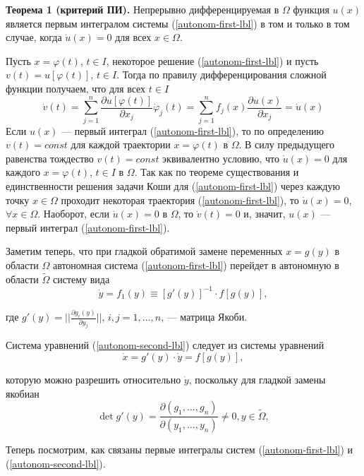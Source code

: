\par \textbf{Теорема 1 (критерий ПИ).} Непрерывно дифференцируемая в $\Omega$ функция $u(x)$ является
первым интегралом системы (\ref{autonom-first-lbl}) в том и только в том случае, когда
$\dot{u}(x) = 0$ для всех $x \in \Omega$.
\par \Proof Пусть $x=\varphi(t)$, $t \in I$, некоторое решение (\ref{autonom-first-lbl}) и пусть $v(t) = u[\varphi(t)]$,
$t \in I$. Тогда по правилу дифференцирования сложной функции получаем, что для всех $t \in I$
$$\dot{v}(t)=\sum_{j=1}^n \frac{\partial u[\varphi(t)]}{\partial x_j}\dot{\varphi}_j(t)=\sum_{j=1}^n f_j(x) \frac{\partial u(x)}{\partial x_j}=\dot{u}(x)$$
Если $u(x)$ — первый интеграл (\ref{autonom-first-lbl}), то по определению $v(t) = const$ для каждой траектории $x= \varphi(t)$ в $\Omega$. В силу предыдущего равенства тождество
$v(t) = const$ эквивалентно условию, что $\dot{u}(x) = 0$ для каждого $x = \varphi(t)$,
$t \in I$ в $\Omega$. Так как по теореме существования и единственности решения
задачи Коши для (\ref{autonom-first-lbl}) через каждую точку $x \in \Omega$ проходит некоторая
траектория (\ref{autonom-first-lbl}), то $\dot{u}(x)=0$, $\forall x \in \Omega$. Наоборот, если $\dot{u}(x) = 0$ в $\Omega$, то $\dot{v}(t) = 0$ и, значит, $u(x)$ — первый интеграл (\ref{autonom-first-lbl}). \EndProof 

\par Заметим теперь, что при гладкой обратимой замене переменных
$x = g(y)$ в области $\Omega$ автономная система (\ref{autonom-first-lbl}) перейдет в автономную в области $\tilde{\Omega}$ систему вида
\begin{equation}\label{autonom-second-lbl}
    \dot{y}=f_1(y)\equiv [g'(y)]^{-1} \cdot f[g(y)],
\end{equation}

\par где $g'(y) = ||\frac{\partial g_i(y)}{\partial y_j}||$, $i,j = 1,\ldots, n$, — матрица Якоби.

\par Система уравнений (\ref{autonom-second-lbl}) следует из системы уравнений
$$\dot{x} = g'(y) \cdot \dot{y} = f[g(y)],$$
\par которую можно разрешить относительно $\dot{y}$, поскольку для гладкой замены якобиан
$$\det g'(y)=\frac{\partial(g_1, \ldots, g_n)}{\partial(y_1, \ldots, y_n)}\neq 0, y \in \tilde{\Omega},$$

\par Теперь посмотрим, как связаны первые интегралы систем (\ref{autonom-first-lbl}) и (\ref{autonom-second-lbl}).

